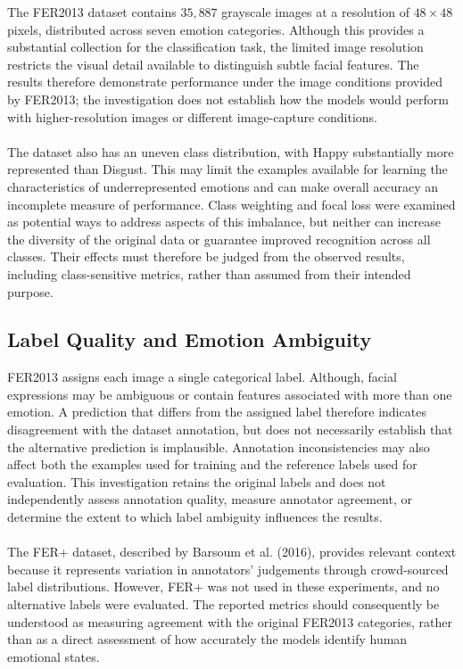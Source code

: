 \documentclass[12pt, a4paper]{report}
\let\oldsubsection\subsection
\renewcommand{\subsection}{%
    \Needspace{6\baselineskip}%
    \oldsubsection
}
\begin{document}
				The FER2013 dataset contains $35,887$ grayscale images at a resolution of $48\times48$ pixels, distributed across seven emotion categories. Although this provides a substantial collection for the classification task, the limited image resolution restricts the visual detail available to distinguish subtle facial features. The results therefore demonstrate performance under the image conditions provided by FER2013; the investigation does not establish how the models would perform with higher-resolution images or different image-capture conditions.\\\\
				The dataset also has an uneven class distribution, with Happy substantially more represented than Disgust. This may limit the examples available for learning the characteristics of underrepresented emotions and can make overall accuracy an incomplete measure of performance. Class weighting and focal loss were examined as potential ways to address aspects of this imbalance, but neither can increase the diversity of the original data or guarantee improved recognition across all classes. Their effects must therefore be judged from the observed results, including class-sensitive metrics, rather than assumed from their intended purpose.
				
			\newpage
			\subsection{Label Quality and Emotion Ambiguity}
				
				FER2013 assigns each image a single categorical label. Although, facial expressions may be ambiguous or contain features associated with more than one emotion. A prediction that differs from the assigned label therefore indicates disagreement with the dataset annotation, but does not necessarily establish that the alternative prediction is implausible. Annotation inconsistencies may also affect both the examples used for training and the reference labels used for evaluation. This investigation retains the original labels and does not independently assess annotation quality, measure annotator agreement, or determine the extent to which label ambiguity influences the results.\\\\
				The FER+ dataset, described by Barsoum et al. (2016)\cite{Barsoum2016FERPlus}, provides relevant context because it represents variation in annotators' judgements through crowd-sourced label distributions. However, FER+ was not used in these experiments, and no alternative labels were evaluated. The reported metrics should consequently be understood as measuring agreement with the original FER2013 categories, rather than as a direct assessment of how accurately the models identify human emotional states.
				
\end{document}
